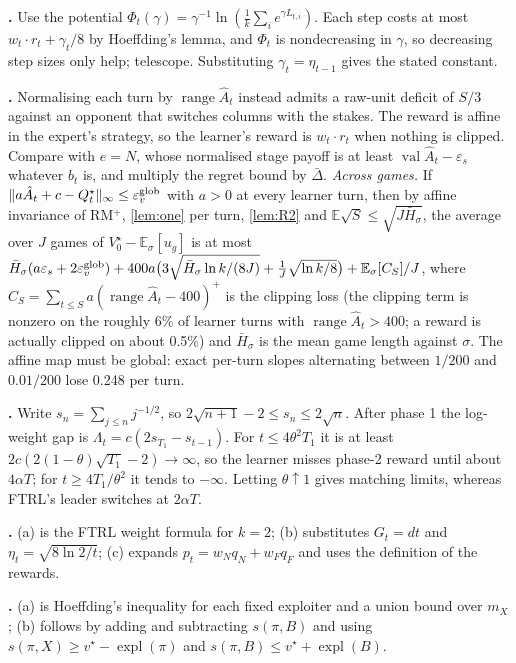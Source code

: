 \documentclass[10pt]{article}
\theoremstyle{plain}
\theoremstyle{definition}
\theoremstyle{remark}
\newcommand{\E}{\mathbb{E}}
\newcommand{\Hbar}{\bar H}
\newcommand{\epss}{\varepsilon_s}
\newcommand{\epsv}{\varepsilon_v}
\newcommand{\Ahat}{\hat A}
\newcommand{\Qstar}{Q^\star}
\newcommand{\Vstar}{V^\star}
\newcommand{\Dbar}{\bar\Delta}
\DeclareMathOperator{\val}{val}
\DeclareMathOperator{\expl}{expl}
\DeclareMathOperator{\range}{range}
\begin{document}
\textbf{.} Use the potential $\Phi_t(\gamma)=\gamma^{-1}\ln(\frac1k\sum_ie^{\gamma L_{t,i}})$. Each step costs at most $w_t\cdot r_t+\gamma_t/8$ by Hoeffding's lemma, and $\Phi_t$ is nondecreasing in $\gamma$, so decreasing step sizes only help; telescope. Substituting $\gamma_t=\eta_{t-1}$ gives the stated constant.

\textbf{.} Normalising each turn by $\range\Ahat_t$ instead admits a raw-unit deficit of $S/3$ against an opponent that switches columns with the stakes. The reward is affine in the expert's strategy, so the learner's reward is $w_t\cdot r_t$ when nothing is clipped. Compare with $e=N$, whose normalised stage payoff is at least $\val\Ahat_t-\epss$ whatever $b_t$ is, and multiply the regret bound by $\Dbar$. \emph{Across games.} If $\lVert a\Ahat_t+c-\Qstar_t\rVert_\infty\le\epsv^{\rm glob}$ with $a>0$ at every learner turn, then by affine invariance of RM$^+$, \cref{lem:one} per turn, \cref{lem:R2} and $\E\sqrt S\le\sqrt{J\Hbar_\sigma}$, the average over $J$ games of $\Vstar_0-\E_\sigma[u_g]$ is at most $\Hbar_\sigma(a\epss+2\epsv^{\rm glob})+400a\big(3\sqrt{\Hbar_\sigma\ln k/(8J)}+\frac1J\sqrt{\ln k/8}\big)+\E_\sigma[C_S]/J$, where $C_S=\sum_{t\le S}a(\range\Ahat_t-400)^+$ is the clipping loss (the clipping term is nonzero on the roughly 6\% of learner turns with $\range\Ahat_t>400$; a reward is actually clipped on about 0.5\%) and $\Hbar_\sigma$ is the mean game length against $\sigma$. The affine map must be global: exact per-turn slopes alternating between $1/200$ and $0.01/200$ lose 0.248 per turn.

\textbf{.} Write $s_n=\sum_{j\le n}j^{-1/2}$, so $2\sqrt{n+1}-2\le s_n\le2\sqrt n$. After phase 1 the log-weight gap is $\Lambda_t=c(2s_{T_1}-s_{t-1})$. For $t\le4\theta^2T_1$ it is at least $2c(2(1-\theta)\sqrt{T_1}-2)\to\infty$, so the learner misses phase-2 reward until about $4\alpha T$; for $t\ge4T_1/\theta^2$ it tends to $-\infty$. Letting $\theta\uparrow1$ gives matching limits, whereas FTRL's leader switches at $2\alpha T$.

\textbf{.} (a) is the FTRL weight formula for $k=2$; (b) substitutes $G_t=dt$ and $\eta_t=\sqrt{8\ln2/t}$; (c) expands $p_t=w_Nq_N+w_Fq_F$ and uses the definition of the rewards.

\textbf{.} (a) is Hoeffding's inequality for each fixed exploiter and a union bound over $m_X$; (b) follows by adding and subtracting $s(\pi,B)$ and using $s(\pi,X)\ge v^\star-\expl(\pi)$ and $s(\pi,B)\le v^\star+\expl(B)$.
\end{document}
